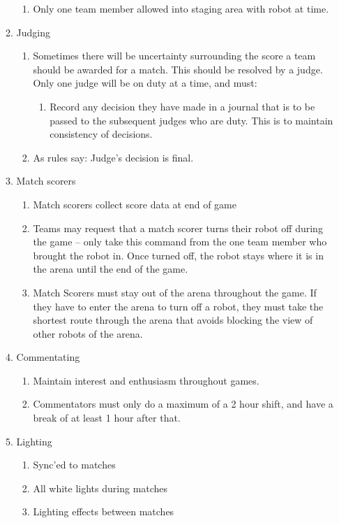 \begin{enumerate}
\begin{enumerate}
\begin{enumerate}
    \item Only one team member allowed into staging area with robot at time.
    \end{enumerate}

  \item Judging
    \begin{enumerate}
    \item Sometimes there will be uncertainty surrounding the score a team should be awarded for a match.  This should be resolved by a judge.  Only one judge will be on duty at a time, and must:
      \begin{enumerate}
      \item Record any decision they have made in a journal that is to be passed to the subsequent judges who are duty.  This is to maintain consistency of decisions.
      \end{enumerate}
    \item As rules say: Judge's decision is final.
    \end{enumerate}

  \item Match scorers
    \begin{enumerate}
    \item Match scorers collect score data at end of game
    \item Teams may request that a match scorer turns their robot off during the game -- only take this command from the one team member who brought the robot in.  Once turned off, the robot stays where it is in the arena until the end of the game.
    \item Match Scorers must stay out of the arena throughout the game.  If they have to enter the arena to turn off a robot, they must take the shortest route through the arena that avoids blocking the view of other robots of the arena.
    \end{enumerate}

  \item Commentating
    \begin{enumerate}
    \item Maintain interest and enthusiasm throughout games.
    \item Commentators must only do a maximum of a 2 hour shift, and have a break of at least 1 hour after that.
    \end{enumerate}


  \item Lighting
    \begin{enumerate}
    \item Sync'ed to matches
    \item All white lights during matches
    \item Lighting effects between matches
    \end{enumerate}


\end{enumerate}
\end{enumerate}
